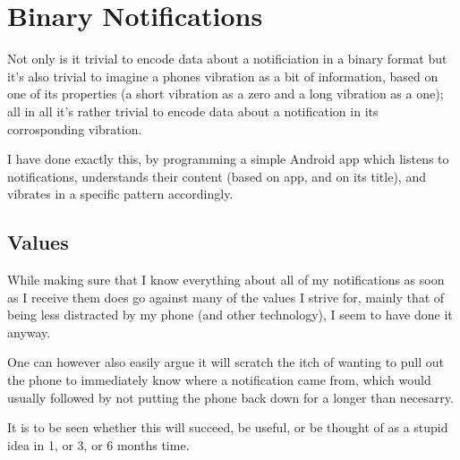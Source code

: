 \documentclass{article}
\begin{document}
\newcommand{\textr}[1]{
 \hfill \texttt{#1}
}
\newcommand{\cname}[1]{
 #1...
}
\section{Binary Notifications} 
Not only is it trivial to encode data about a notificiation in a binary format but it's also trivial to imagine a phones vibration as a bit of information, based on one of its properties (\eg a short vibration as a zero and a long vibration as a one); all in all it's rather trivial to encode data about a notification in its corrosponding vibration.

I have done exactly this, by programming a simple Android app which listens to notifications, understands their content (based on app, and on its title), and vibrates in a specific pattern accordingly.

\subsection{Values}
While making sure that I know everything about all of my notifications as soon as I receive them does go against many of the values I strive for, mainly that of being less distracted by my phone (and other technology), I seem to have done it anyway.

One can however also easily argue it will scratch the itch of wanting to pull out the phone to immediately know where a notification came from, which would usually followed by not putting the phone back down for a longer than necesarry.

It is to be seen whether this will succeed, be useful, or be thought of as a stupid idea in 1, or 3, or 6 months time.
\end{document}
